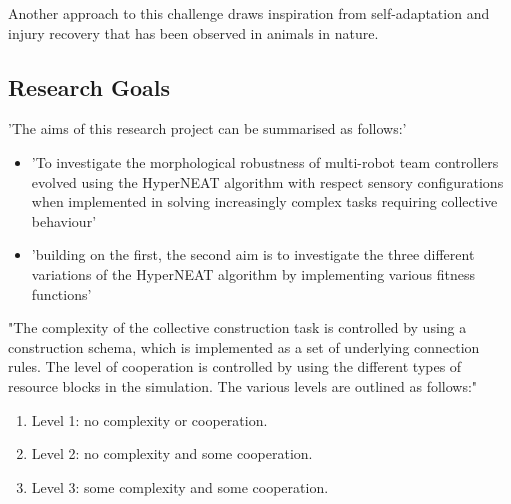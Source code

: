 
Another approach to this challenge draws inspiration from self-adaptation and injury recovery that has been observed in animals in nature.







\subsection{Research Goals}

'The aims of this research project can be summarised as follows:'
\begin{itemize}
	\item 'To investigate the morphological robustness of multi-robot team controllers evolved using the HyperNEAT algorithm with respect sensory configurations when implemented in solving increasingly complex tasks requiring collective behaviour'
	\item 'building on the first, the second aim is to investigate the three different variations of the HyperNEAT algorithm by implementing various fitness functions'
\end{itemize}

"The complexity of the collective construction task is controlled by using a construction schema, which is implemented as a set of underlying connection rules. The level of cooperation is controlled by using the different types of resource blocks in the simulation.
The various levels are outlined as follows:"
\begin{enumerate}
	\item Level 1: no complexity or cooperation.
	\item Level 2: no complexity and some cooperation.
	\item Level 3: some complexity and some cooperation.
\end{enumerate}

